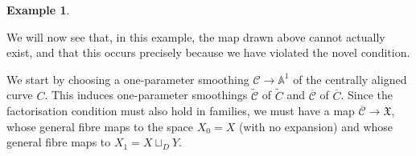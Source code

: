 \documentclass[11pt]{amsart}
\renewcommand{\to}{\rightarrow}
\newcommand{\Aaff}{\mathbb{A}}
\theoremstyle{definition}
\theoremstyle{definition}
\newtheorem{example}[thm]{Example}
\begin{document}
\begin{example}
\begin{center}
\end{center}
We will now see that, in this example, the map drawn above cannot actually exist, and that this occurs precisely because we have violated the novel condition.

We start by choosing a one-parameter smoothing $\mathcal{C} \to \Aaff^1$ of the centrally aligned curve $C$. This induces one-parameter smoothings $\widetilde{\mathcal{C}}$ of $\widetilde{C}$ and $\overline{\mathcal{C}}$ of $\overline{C}$. Since the factorisation condition must also hold in families, we must have a map $\overline{\mathcal{C}} \to \mathfrak{X}$, whose general fibre maps to the space $X_0=X$ (with no expansion) and whose general fibre maps to $X_1=X \sqcup_D Y$.


\end{example}
\end{document}
